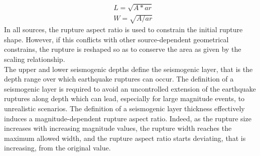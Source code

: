 \begin{equation}
\begin{split} \label{eq:rup_l_w}
&L = \sqrt{A * ar}  \\
&W = \sqrt{A / ar}
\end{split}
\end{equation}
In all sources, the rupture aspect ratio is used to constrain the initial rupture shape. However, if this conflicts with other source-dependent geometrical constrains, the rupture is reshaped so as to conserve the area as given by the scaling relationship.\\
The upper and lower seismogenic depths define the seismogenic layer, that is the depth range over which earthquake ruptures can occur. The definition of a seismogenic layer is required to avoid an uncontrolled extension of the earthquake ruptures along depth which can lead, especially for large magnitude events, to unrealistic scenarios. The definition of a seismogenic layer thickness effectively induces a magnitude-dependent rupture aspect ratio. Indeed, as the rupture size increases with increasing magnitude values, the rupture width reaches the maximum allowed width, and the rupture aspect ratio starts deviating, that is increasing, from the original value.

